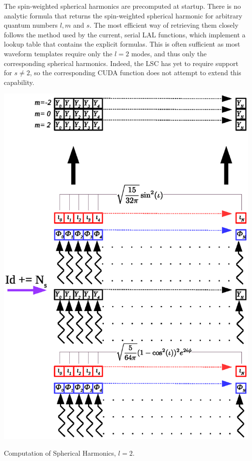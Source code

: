The spin-weighted spherical harmonics are precomputed at startup. There is no analytic formula that returns the spin-weighted spherical harmonic for arbitrary quantum numbers $l, m$ and $s$. The most efficient way of retrieving them closely follows the method used by the current, serial LAL functions, which implement a lookup table that contains the explicit formulas. This is often sufficient as most waveform templates require only the $l=2$ modes, and thus only the corresponding spherical harmonics. Indeed, the LSC has yet to require support for $s \neq 2$, so the corresponding CUDA function does not attempt to extend this capability. 

\begin{wrapfig}
\hspace{-1cm}
\includegraphics[trim={0cm, 2cm, 2cm, 2cm}, clip]{spherical_harmonics.eps}
\caption{Computation of Spherical Harmonics, $l=2$.}
\label{fig:spharms}
\end{wrapfig}

